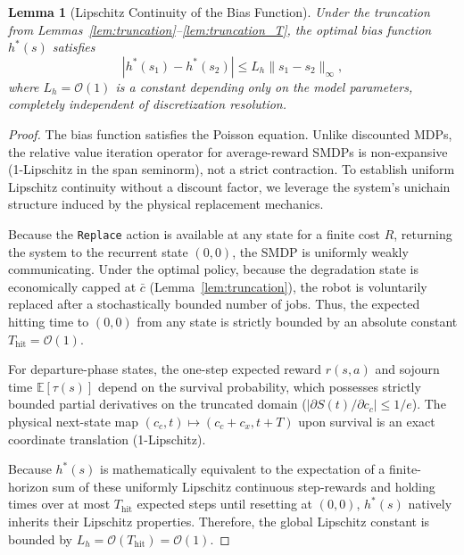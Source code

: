 \documentclass[letterpaper, 10 pt, conference]{IEEEconf}
\newtheorem{lemma}{Lemma}
\newcommand{\E}{\mathbb{E}}
\begin{document}
\begin{lemma}[Lipschitz Continuity of the Bias Function]
    \label{lem:lipschitz}
    Under the truncation from Lemmas~\ref{lem:truncation}--\ref{lem:truncation_T}, the optimal bias function $h^*(s)$ satisfies
    \begin{equation}
        |h^*(s_{1}) - h^*(s_{2})| \leq L_h \|s_{1} - s_{2}\|_\infty,
    \end{equation}
    where $L_h = \mathcal{O}(1)$ is a constant depending only on the model parameters, completely independent of discretization resolution.
\end{lemma}

\begin{proof}
    The bias function satisfies the Poisson equation. Unlike discounted MDPs, the relative value iteration operator for average-reward SMDPs is non-expansive (1-Lipschitz in the span seminorm), not a strict contraction. To establish uniform Lipschitz continuity without a discount factor, we leverage the system's unichain structure induced by the physical replacement mechanics.

    Because the \texttt{Replace} action is available at any state for a finite cost $R$, returning the system to the recurrent state $(0,0)$, the SMDP is uniformly weakly communicating. Under the optimal policy, because the degradation state is economically capped at $\bar{c}$ (Lemma~\ref{lem:truncation}), the robot is voluntarily replaced after a stochastically bounded number of jobs. Thus, the expected hitting time to $(0,0)$ from any state is strictly bounded by an absolute constant $T_{\mathrm{hit}} = \mathcal{O}(1)$.

    For departure-phase states, the one-step expected reward $r(s,a)$ and sojourn time $\E[\tau(s)]$ depend on the survival probability, which possesses strictly bounded partial derivatives on the truncated domain ($|\partial S(t)/\partial c_c| \leq 1/e$). The physical next-state map $(c_c, t) \mapsto (c_c + c_x, t + T)$ upon survival is an exact coordinate translation (1-Lipschitz).

    Because $h^*(s)$ is mathematically equivalent to the expectation of a finite-horizon sum of these uniformly Lipschitz continuous step-rewards and holding times over at most $T_{\mathrm{hit}}$ expected steps until resetting at $(0,0)$, $h^*(s)$ natively inherits their Lipschitz properties. Therefore, the global Lipschitz constant is bounded by $L_h = \mathcal{O}(T_{\mathrm{hit}}) = \mathcal{O}(1)$.
\end{proof}
\end{document}
